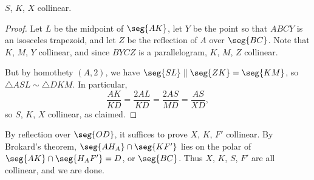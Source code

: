 \begin{iclaim}
    $S$, $K$, $X$ collinear.
\end{iclaim}
\begin{proof}
    Let $L$ be the midpoint of $\seg{AK}$, let $Y$ be the point so that $ABCY$ is an isosceles trapezoid, and let $Z$ be the reflection of $A$ over $\seg{BC}$. Note that $K$, $M$, $Y$ collinear, and since $BYCZ$ is a parallelogram, $K$, $M$, $Z$ collinear.

    But by homothety $(A,2)$, we have $\seg{SL}\parallel\seg{ZK}=\seg{KM}$, so $\triangle ASL\sim\triangle DKM$. In particular, \[\frac{AK}{KD}=\frac{2AL}{KD}=\frac{2AS}{MD}=\frac{AS}{XD},\]
    so $S$, $K$, $X$ collinear, as claimed.
\end{proof}

By reflection over $\seg{OD}$, it suffices to prove $X$, $K$, $F'$ collinear. By Brokard's theorem, $\seg{AH_A}\cap\seg{KF'}$ lies on the polar of $\seg{AK}\cap\seg{H_AF'}=D$, or $\seg{BC}$. Thus $X$, $K$, $S$, $F'$ are all collinear, and we are done.


